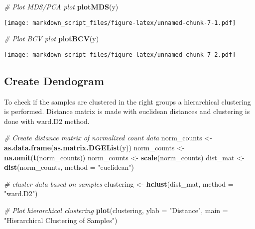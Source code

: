 \documentclass[]{article}
\newenvironment{Shaded}{\begin{snugshade}}{\end{snugshade}}
\newcommand{\KeywordTok}[1]{\textcolor[rgb]{0.13,0.29,0.53}{\textbf{#1}}}
\newcommand{\DataTypeTok}[1]{\textcolor[rgb]{0.13,0.29,0.53}{#1}}
\newcommand{\StringTok}[1]{\textcolor[rgb]{0.31,0.60,0.02}{#1}}
\newcommand{\CommentTok}[1]{\textcolor[rgb]{0.56,0.35,0.01}{\textit{#1}}}
\newcommand{\NormalTok}[1]{#1}
\begin{document}
\begin{Shaded}
\begin{Highlighting}[]
\CommentTok{# Plot MDS/PCA plot}
\KeywordTok{plotMDS}\NormalTok{(y)}
\end{Highlighting}
\end{Shaded}

\texttt{[image: markdown\_script\_files/figure-latex/unnamed-chunk-7-1.pdf]}

\begin{Shaded}
\begin{Highlighting}[]
\CommentTok{# Plot BCV plot}
\KeywordTok{plotBCV}\NormalTok{(y)}
\end{Highlighting}
\end{Shaded}

\texttt{[image: markdown\_script\_files/figure-latex/unnamed-chunk-7-2.pdf]}

\subsection{Create Dendogram}\label{create-dendogram}

To check if the samples are clustered in the right groups a hierarchical
clustering is performed. Distance matrix is made with euclidean
distances and clustering is done with ward.D2 method.

\begin{Shaded}
\begin{Highlighting}[]
\CommentTok{# Create distance matrix of normalized count data}
\NormalTok{norm_counts <-}\StringTok{ }\KeywordTok{as.data.frame}\NormalTok{(}\KeywordTok{as.matrix.DGEList}\NormalTok{(y))}
\NormalTok{norm_counts <-}\StringTok{ }\KeywordTok{na.omit}\NormalTok{(}\KeywordTok{t}\NormalTok{(norm_counts))}
\NormalTok{norm_counts <-}\StringTok{ }\KeywordTok{scale}\NormalTok{(norm_counts)}
\NormalTok{dist_mat <-}\StringTok{ }\KeywordTok{dist}\NormalTok{(norm_counts, }\DataTypeTok{method =} \StringTok{"euclidean"}\NormalTok{)}

\CommentTok{# cluster data based on samples }
\NormalTok{clustering <-}\StringTok{ }\KeywordTok{hclust}\NormalTok{(dist_mat, }\DataTypeTok{method =} \StringTok{"ward.D2"}\NormalTok{)}

\CommentTok{# Plot hierarchical clustering}
\KeywordTok{plot}\NormalTok{(clustering, }\DataTypeTok{ylab =} \StringTok{"Distance"}\NormalTok{, }\DataTypeTok{main =} \StringTok{"Hierarchical Clustering of Samples"}\NormalTok{)}
\end{Highlighting}
\end{Shaded}
\end{document}
